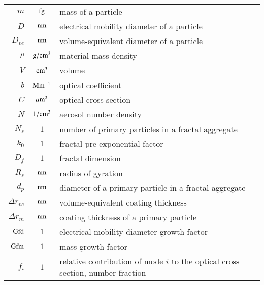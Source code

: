 \begin{tabular}{r c l}
    $m$ & $\rm fg$ & mass of a particle\\
    $D$ & $\rm nm$ & electrical mobility diameter of a particle\\
    $D_{ve}$ & $\rm nm$ & volume-equivalent diameter of a particle\\
    $\rho$ & $\rm g/cm^3$ & material mass density\\
    $V$ & $\rm cm^3$ & volume\\
    $b$ & $\rm Mm^{-1}$ & optical coefficient\\
    $C$ & $\rm \mu m^2$ & optical cross section\\
    $N$ & $\rm 1/cm^3$ & aerosol number density\\
    $N_s$ & $1$ & number of primary particles in a fractal aggregate\\
    $k_0$ & $1$ & fractal pre-exponential factor\\
    $D_f$ & $1$ & fractal dimension\\
    $R_s$ & $\rm nm$ & radius of gyration\\
    $d_p$ & $\rm nm$ & diameter of a primary particle in a fractal aggregate\\
    $\Delta r_{ve}$ & $\rm nm$ & volume-equivalent coating thickness\\
    $\Delta r_m$ & $\rm nm$& coating thickness of a primary particle\\
    $\rm Gfd$ & $1$ & electrical mobility diameter growth factor\\
    $\rm Gfm$ & $1$ & mass growth factor\\
    $f_i$ & $1$ & relative contribution of mode $i$ to the optical cross section, number fraction\\
\end{tabular}